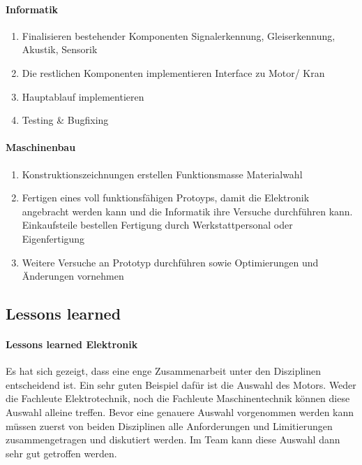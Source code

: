 \documentclass[../../main.tex]{subfiles}
\begin{document}
\paragraph{Informatik}
\begin{enumerate}
    \item Finalisieren bestehender Komponenten
        \subitem Signalerkennung, Gleiserkennung, Akustik, Sensorik
    \item Die restlichen Komponenten implementieren
        \subitem Interface zu Motor/ Kran
    \item Hauptablauf implementieren
    \item Testing \& Bugfixing
\end{enumerate}

\paragraph{Maschinenbau}
\begin{enumerate}
    \item Konstruktionszeichnungen erstellen
    \subitem Funktionsmasse
    \subitem Materialwahl
    \item Fertigen eines voll funktionsfähigen Protoyps, damit die Elektronik angebracht werden kann und die Informatik ihre Versuche durchführen kann.
    \subitem Einkaufsteile bestellen
    \subitem Fertigung durch Werkstattpersonal oder Eigenfertigung
    \item Weitere Versuche an Prototyp durchführen sowie Optimierungen und Änderungen vornehmen
\end{enumerate}

\subsection{Lessons learned}

\paragraph{Lessons learned Elektronik}
Es hat sich gezeigt, dass eine enge Zusammenarbeit unter den Disziplinen entscheidend ist. Ein sehr guten Beispiel dafür ist die Auswahl des Motors. Weder die Fachleute Elektrotechnik, noch die Fachleute Maschinentechnik können diese Auswahl alleine treffen. Bevor eine genauere Auswahl vorgenommen werden kann müssen zuerst von beiden Disziplinen alle Anforderungen und Limitierungen zusammengetragen und diskutiert werden. Im Team kann diese Auswahl dann sehr gut getroffen werden.
\end{document}
